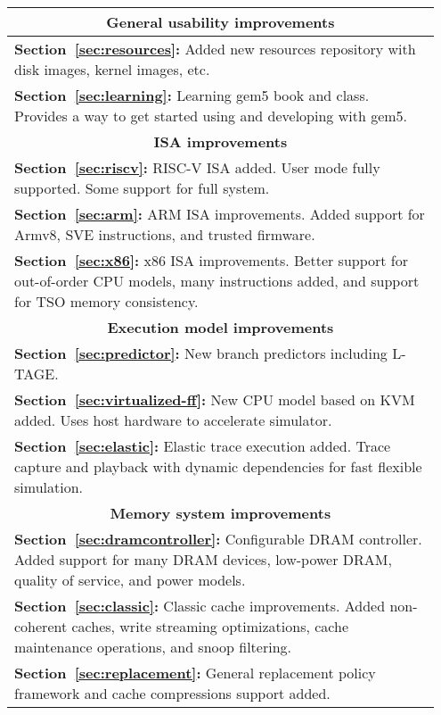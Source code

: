 \begin{table}
    \begin{tabular}{|p{0.95\linewidth}|}
        \hline
        \multicolumn{1}{|c|}{\textbf{General usability improvements} } \\
        \hline
        \textbf{Section~\ref{sec:resources}:} Added new resources repository with disk images, kernel images, etc. \\
        \textbf{Section~\ref{sec:learning}:} Learning gem5 book and class. Provides a way to get started using and developing with gem5. \\
        \hline \hline
        \multicolumn{1}{|c|}{ \textbf{ISA improvements} } \\
        \hline
        \textbf{Section~\ref{sec:riscv}:} RISC-V ISA added. User mode fully supported. Some support for full system. \\
        \textbf{Section~\ref{sec:arm}:} ARM ISA improvements. Added support for Armv8, SVE instructions, and trusted firmware. \\
        \textbf{Section~\ref{sec:x86}:} x86 ISA improvements. Better support for out-of-order CPU models, many instructions added, and support for TSO memory consistency. \\
        \hline \hline
        \multicolumn{1}{|c|}{\textbf{Execution model improvements} } \\
        \hline
        \textbf{Section~\ref{sec:predictor}:} New branch predictors including L-TAGE.\\
        \textbf{Section~\ref{sec:virtualized-ff}:} New CPU model based on KVM added. Uses host hardware to accelerate simulator. \\
        \textbf{Section~\ref{sec:elastic}:} Elastic trace execution added. Trace capture and playback with dynamic dependencies for fast flexible simulation. \\
        \hline \hline
        \multicolumn{1}{|c|}{\textbf{Memory system improvements} }\\
        \hline
        \textbf{Section~\ref{sec:dramcontroller}:} Configurable DRAM controller. Added support for many DRAM devices, low-power DRAM, quality of service, and power models. \\
        \textbf{Section~\ref{sec:classic}:} Classic cache improvements. Added non-coherent caches, write streaming optimizations, cache maintenance operations, and snoop filtering. \\
        \textbf{Section~\ref{sec:replacement}:} General replacement policy framework and cache compressions support added. \\

\end{tabular}
\end{table}
